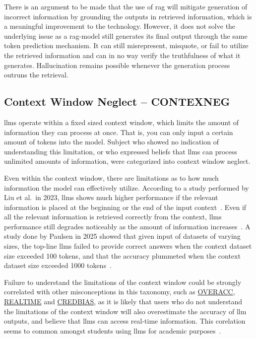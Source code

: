 There is an argument to be made that the use of \gls{rag} will mitigate generation of incorrect information by grounding the outputs in retrieved information, which is a meaningful improvement to the technology.
However, it does not solve the underlying issue as a \gls{rag}-model still generates its final output through the same token prediction mechanism. It can still misrepresent, misquote, or fail to utilize the retrieved information and can in no way verify the truthfulness of what it generates. Hallucination remains possible whenever the generation process outruns the retrieval.

\subsection{Context Window Neglect -- CONTEXNEG}\label{contexneg}
\gls{llms} operate within a fixed sized context window, which limits the amount of information they can process at once. That is, you can only input a certain amount of tokens into the model. Subject who showed no indication of understanding this limitation, or who expressed beliefs that \gls{llms} can process unlimited amounts of information, were categorized into context window neglect.

Even within the context window, there are limitations as to how much information the model can effectively utilize. According to a study performed by Liu et al.~in 2023, \gls{llms} shows much higher performance if the relevant information is placed at the beginning or the end of the input context~\cite{liu_lost_2024}. Even if all the relevant information is retrieved correctly from the context, \gls{llms} performance still degrades noticeably as the amount of information increases~\cite{du_context_2025}. A study done by Paulsen in 2025 showed that given input of datasets of varying sizes, the top-line \gls{llms} failed to provide correct answers when the context dataset size exceeded 100 tokens, and that the accuracy plummeted when the context dataset size exceeded 1000 tokens~\cite{paulsen_context_2025}.

Failure to understand the limitations of the context window could be strongly correlated with other misconceptions in this taxonomy, such as \hyperref[overacc]{OVERACC}, \hyperref[realtime]{REALTIME} and \hyperref[credbias]{CREDBIAS}, as it is likely that users who do not understand the limitations of the context window will also overestimate the accuracy of \gls{llm} outputs, and believe that \gls{llms} can access real-time information. This corelation seems to common amongst students using \gls{llms} for academic purposes~\cite{obrien_user_2025,rismanchian_what_2026}.

